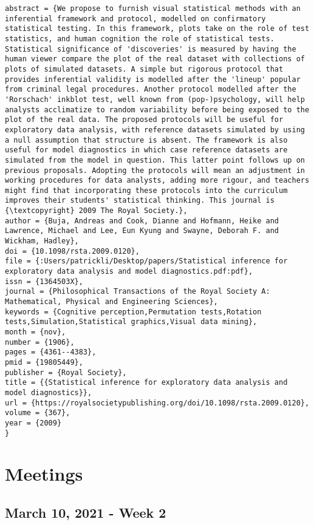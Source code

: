 \documentclass[
]{book}
\begin{document}
\begin{verbatim}
abstract = {We propose to furnish visual statistical methods with an inferential framework and protocol, modelled on confirmatory statistical testing. In this framework, plots take on the role of test statistics, and human cognition the role of statistical tests. Statistical significance of 'discoveries' is measured by having the human viewer compare the plot of the real dataset with collections of plots of simulated datasets. A simple but rigorous protocol that provides inferential validity is modelled after the 'lineup' popular from criminal legal procedures. Another protocol modelled after the 'Rorschach' inkblot test, well known from (pop-)psychology, will help analysts acclimatize to random variability before being exposed to the plot of the real data. The proposed protocols will be useful for exploratory data analysis, with reference datasets simulated by using a null assumption that structure is absent. The framework is also useful for model diagnostics in which case reference datasets are simulated from the model in question. This latter point follows up on previous proposals. Adopting the protocols will mean an adjustment in working procedures for data analysts, adding more rigour, and teachers might find that incorporating these protocols into the curriculum improves their students' statistical thinking. This journal is {\textcopyright} 2009 The Royal Society.},
author = {Buja, Andreas and Cook, Dianne and Hofmann, Heike and Lawrence, Michael and Lee, Eun Kyung and Swayne, Deborah F. and Wickham, Hadley},
doi = {10.1098/rsta.2009.0120},
file = {:Users/patrickli/Desktop/papers/Statistical inference for exploratory data analysis and model diagnostics.pdf:pdf},
issn = {1364503X},
journal = {Philosophical Transactions of the Royal Society A: Mathematical, Physical and Engineering Sciences},
keywords = {Cognitive perception,Permutation tests,Rotation tests,Simulation,Statistical graphics,Visual data mining},
month = {nov},
number = {1906},
pages = {4361--4383},
pmid = {19805449},
publisher = {Royal Society},
title = {{Statistical inference for exploratory data analysis and model diagnostics}},
url = {https://royalsocietypublishing.org/doi/10.1098/rsta.2009.0120},
volume = {367},
year = {2009}
}
\end{verbatim}

\hypertarget{meetings}{%
\chapter{Meetings}\label{meetings}}

\hypertarget{march-10-2021---week-2}{%
\section{March 10, 2021 - Week 2}\label{march-10-2021---week-2}}
\end{document}
